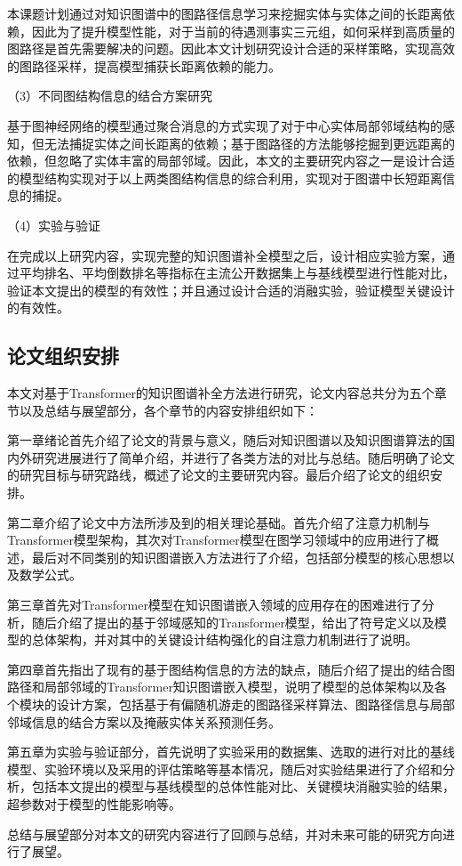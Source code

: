 本课题计划通过对知识图谱中的图路径信息学习来挖掘实体与实体之间的长距离依赖，因此为了提升模型性能，对于当前的待遇测事实三元组，如何采样到高质量的图路径是首先需要解决的问题。因此本文计划研究设计合适的采样策略，实现高效的图路径采样，提高模型捕获长距离依赖的能力。

（3）不同图结构信息的结合方案研究

基于图神经网络的模型通过聚合消息的方式实现了对于中心实体局部邻域结构的感知，但无法捕捉实体之间长距离的依赖；基于图路径的方法能够挖掘到更远距离的依赖，但忽略了实体丰富的局部邻域。因此，本文的主要研究内容之一是设计合适的模型结构实现对于以上两类图结构信息的综合利用，实现对于图谱中长短距离信息的捕捉。

（4）实验与验证

在完成以上研究内容，实现完整的知识图谱补全模型之后，设计相应实验方案，通过平均排名、平均倒数排名等指标在主流公开数据集上与基线模型进行性能对比，验证本文提出的模型的有效性；并且通过设计合适的消融实验，验证模型关键设计的有效性。

\subsection{论文组织安排}
本文对基于Transformer的知识图谱补全方法进行研究，论文内容总共分为五个章节以及总结与展望部分，各个章节的内容安排组织如下：

第一章绪论首先介绍了论文的背景与意义，随后对知识图谱以及知识图谱算法的国内外研究进展进行了简单介绍，并进行了各类方法的对比与总结。随后明确了论文的研究目标与研究路线，概述了论文的主要研究内容。最后介绍了论文的组织安排。

第二章介绍了论文中方法所涉及到的相关理论基础。首先介绍了注意力机制与Transformer模型架构，其次对Transformer模型在图学习领域中的应用进行了概述，最后对不同类别的知识图谱嵌入方法进行了介绍，包括部分模型的核心思想以及数学公式。

第三章首先对Transformer模型在知识图谱嵌入领域的应用存在的困难进行了分析，随后介绍了提出的基于邻域感知的Transformer模型，给出了符号定义以及模型的总体架构，并对其中的关键设计结构强化的自注意力机制进行了说明。

第四章首先指出了现有的基于图结构信息的方法的缺点，随后介绍了提出的结合图路径和局部邻域的Transformer知识图谱嵌入模型，说明了模型的总体架构以及各个模块的设计方案，包括基于有偏随机游走的图路径采样算法、图路径信息与局部邻域信息的结合方案以及掩蔽实体关系预测任务。

第五章为实验与验证部分，首先说明了实验采用的数据集、选取的进行对比的基线模型、实验环境以及采用的评估策略等基本情况，随后对实验结果进行了介绍和分析，包括本文提出的模型与基线模型的总体性能对比、关键模块消融实验的结果，超参数对于模型的性能影响等。

总结与展望部分对本文的研究内容进行了回顾与总结，并对未来可能的研究方向进行了展望。